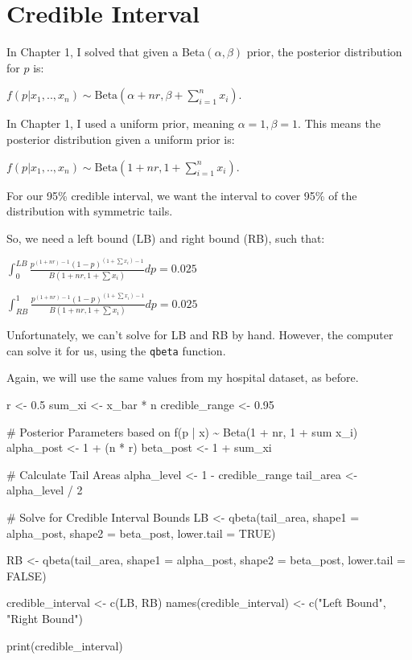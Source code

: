 \documentclass[
  letterpaper,
  DIV=11,
  numbers=noendperiod]{scrreprt}
\newenvironment{Shaded}{\begin{snugshade}}{\end{snugshade}}
\newcommand{\NormalTok}[1]{\textcolor[rgb]{0.00,0.23,0.31}{#1}}
\begin{document}
\section{Credible Interval}\label{credible-interval}

In Chapter 1, I solved that given a Beta\((\alpha, \beta)\) prior, the
posterior distribution for \(p\) is:

\(f(p | x_1,..,x_n) \sim \text{Beta}(\alpha + nr, \beta + \sum_{i=1}^n x_i)\).

In Chapter 1, I used a uniform prior, meaning \(\alpha =1, \beta=1\).
This means the posterior distribution given a uniform prior is:

\(f(p | x_1,..,x_n) \sim \text{Beta}(1 + nr, 1 + \sum_{i=1}^n x_i)\).

For our 95\% credible interval, we want the interval to cover 95\% of
the distribution with symmetric tails.

So, we need a left bound (LB) and right bound (RB), such that:

\(\int_{0}^{LB} \frac{p^{(1+nr)-1} (1-p)^{(1+\sum x_i)-1}}{B(1+nr, 1+\sum x_i)} dp = 0.025\)

\(\int_{RB}^{1} \frac{p^{(1+nr)-1} (1-p)^{(1+\sum x_i)-1}}{B(1+nr, 1+\sum x_i)} dp = 0.025\)

Unfortunately, we can't solve for LB and RB by hand. However, the
computer can solve it for us, using the \texttt{qbeta} function.

Again, we will use the same values from my hospital dataset, as before.

\begin{Shaded}
\begin{Highlighting}[]
\NormalTok{r \textless{}{-} 0.5}
\NormalTok{sum\_xi \textless{}{-} x\_bar * n }
\NormalTok{credible\_range \textless{}{-} 0.95}

\NormalTok{\# Posterior Parameters based on f(p | x) \textasciitilde{} Beta(1 + nr, 1 + sum x\_i)}
\NormalTok{alpha\_post \textless{}{-} 1 + (n * r)}
\NormalTok{beta\_post  \textless{}{-} 1 + sum\_xi}

\NormalTok{\# Calculate Tail Areas}
\NormalTok{alpha\_level \textless{}{-} 1 {-} credible\_range}
\NormalTok{tail\_area   \textless{}{-} alpha\_level / 2}

\NormalTok{\# Solve for Credible Interval Bounds}
\NormalTok{LB \textless{}{-} qbeta(tail\_area, }
\NormalTok{            shape1 = alpha\_post, }
\NormalTok{            shape2 = beta\_post, }
\NormalTok{            lower.tail = TRUE)}

\NormalTok{RB \textless{}{-} qbeta(tail\_area, }
\NormalTok{            shape1 = alpha\_post, }
\NormalTok{            shape2 = beta\_post, }
\NormalTok{            lower.tail = FALSE)}

\NormalTok{credible\_interval \textless{}{-} c(LB, RB)}
\NormalTok{names(credible\_interval) \textless{}{-} c("Left Bound", "Right Bound")}

\NormalTok{print(credible\_interval)}
\end{Highlighting}
\end{Shaded}
\end{document}
